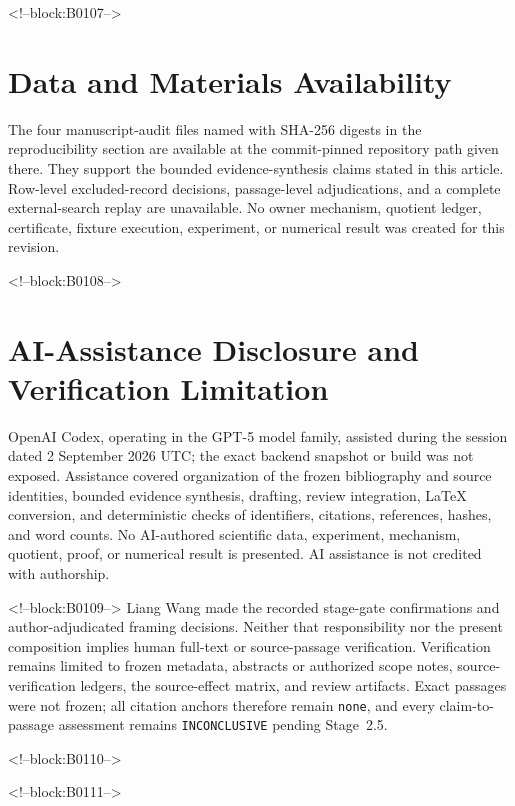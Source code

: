 \documentclass[11pt,a4paper]{article}
\begin{document}
<!--block:B0107-->
\section*{Data and Materials Availability}
The four manuscript-audit files named with SHA-256 digests in the reproducibility section are available at the commit-pinned repository path given there. They support the bounded evidence-synthesis claims stated in this article. Row-level excluded-record decisions, passage-level adjudications, and a complete external-search replay are unavailable. No owner mechanism, quotient ledger, certificate, fixture execution, experiment, or numerical result was created for this revision.

<!--block:B0108-->
\section*{AI-Assistance Disclosure and Verification Limitation}
OpenAI Codex, operating in the GPT-5 model family, assisted during the session dated 2 September 2026 UTC; the exact backend snapshot or build was not exposed. Assistance covered organization of the frozen bibliography and source identities, bounded evidence synthesis, drafting, review integration, LaTeX conversion, and deterministic checks of identifiers, citations, references, hashes, and word counts. No AI-authored scientific data, experiment, mechanism, quotient, proof, or numerical result is presented. AI assistance is not credited with authorship.

<!--block:B0109-->
Liang Wang made the recorded stage-gate confirmations and author-adjudicated framing decisions. Neither that responsibility nor the present composition implies human full-text or source-passage verification. Verification remains limited to frozen metadata, abstracts or authorized scope notes, source-verification ledgers, the source-effect matrix, and review artifacts. Exact passages were not frozen; all citation anchors therefore remain \texttt{none}, and every claim-to-passage assessment remains \texttt{INCONCLUSIVE} pending Stage~2.5.

<!--block:B0110-->



<!--block:B0111-->
\end{document}
